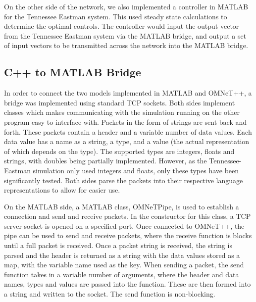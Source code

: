   On the other side of the network, we also implemented a 
  controller in MATLAB for the Tennessee Eastman system.  This
  used steady state calculations to determine the optimal controls.
  The controller would input the output vector from the Tennessee
  Eastman system via the MATLAB bridge, and output a set of input
  vectors to be transmitted across the network into the MATLAB
  bridge.

\subsection{C++ to MATLAB Bridge}

In order to connect the two models implemented in MATLAB and OMNeT++, a bridge was implemented using standard TCP sockets. Both sides implement classes which makes communicating with the simulation running on the other program easy to interface with. Packets in the form of strings are sent back and forth. These packets contain a header and a variable number of data values. Each data value has a name as a string, a type, and a value (the actual representation of which depends on the type). The supported types are integers, floats and strings, with doubles being partially implemented. However, as the Tennessee-Eastman simulation only used integers and floats, only these types have been significantly tested. Both sides parse the packets into their respective language representations to allow for easier use.

On the MATLAB side, a MATLAB class, OMNeTPipe, is used to establish a connection and send and receive packets. In the constructor for this class, a TCP server socket is opened on a specified port. Once connected to OMNeT++, the pipe can be used to send and receive packets, where the receive function is blocks until a full packet is received. Once a packet string is received, the string is parsed and the header is returned as a string with the data values stored as a map, with the variable name used as the key. When sending a packet, the send function takes in a variable number of arguments, where the header and data names, types and values are passed into the function. These are then formed into a string and written to the socket. The send function is non-blocking.

